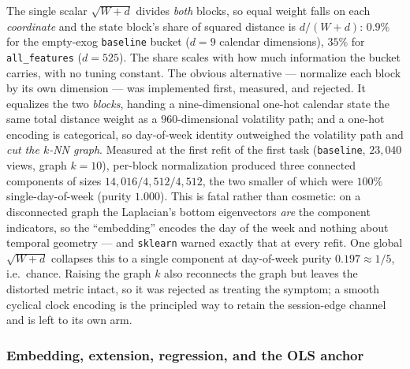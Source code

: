The single scalar $\sqrt{W+d}$ divides \emph{both} blocks, so equal weight falls on
each \emph{coordinate} and the state block's share of squared distance is
$d/(W+d)$: $0.9\%$ for the empty-exog \texttt{baseline} bucket ($d = 9$ calendar
dimensions), $35\%$ for \texttt{all\_features} ($d = 525$). The share scales with
how much information the bucket carries, with no tuning constant. The obvious
alternative --- normalize each block by its own dimension --- was implemented
first, measured, and rejected. It equalizes the two \emph{blocks}, handing a
nine-dimensional one-hot calendar state the same total distance weight as a
$960$-dimensional volatility path; and a one-hot encoding is categorical, so
day-of-week identity outweighed the volatility path and \emph{cut the $k$-NN
graph}. Measured at the first refit of the first task (\texttt{baseline},
$23{,}040$ views, graph $k = 10$), per-block normalization produced three connected
components of sizes $14{,}016 / 4{,}512 / 4{,}512$, the two smaller of which were
$100\%$ single-day-of-week (purity $1.000$). This is fatal rather than cosmetic: on
a disconnected graph the Laplacian's bottom eigenvectors \emph{are} the component
indicators, so the ``embedding'' encodes the day of the week and nothing about
temporal geometry --- and \texttt{sklearn} warned exactly that at every refit. One
global $\sqrt{W+d}$ collapses this to a single component at day-of-week purity
$0.197 \approx 1/5$, i.e.\ chance. Raising the graph $k$ also reconnects the graph
but leaves the distorted metric intact, so it was rejected as treating the symptom;
a smooth cyclical clock encoding is the principled way to retain the session-edge
channel and is left to its own arm.

\subsubsection{Embedding, extension, regression, and the OLS anchor}

